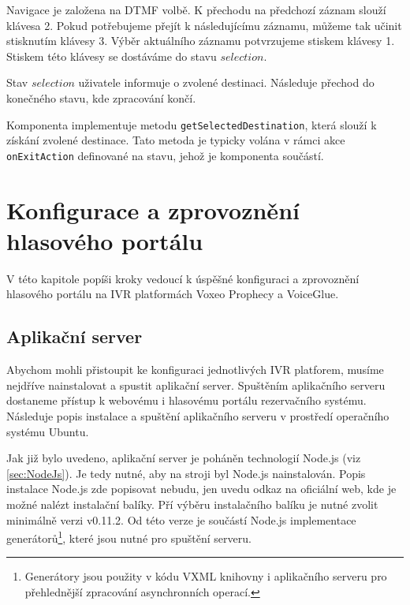 \documentclass[ing,male,java,dept460,twoside]{diploma}						%
\begin{document}
Navigace je založena na DTMF volbě. K přechodu na předchozí záznam slouží klávesa 2. Pokud potřebujeme přejít k následujícímu záznamu, můžeme tak učinit stisknutím klávesy 3. Výběr aktuálního záznamu potvrzujeme stiskem klávesy 1. Stiskem této klávesy se dostáváme do stavu $selection$.

Stav $selection$ uživatele informuje o zvolené destinaci. Následuje přechod do konečného stavu, kde zpracování končí.

Komponenta implementuje metodu \texttt{getSelectedDestination}, která slouží k získání zvolené destinace. Tato metoda je typicky volána v rámci akce \texttt{onExitAction} definované na stavu, jehož je komponenta součástí.



\section{Konfigurace a zprovoznění hlasového portálu}
V této kapitole popíši kroky vedoucí k úspěšné konfiguraci a zprovoznění hlasového portálu na IVR platformách Voxeo Prophecy a VoiceGlue.

\subsection{Aplikační server}
\label{sec:App_server}
Abychom mohli přistoupit ke konfiguraci jednotlivých IVR platforem, musíme nejdříve nainstalovat a spustit aplikační server. Spuštěním aplikačního serveru dostaneme přístup k webovému i hlasovému portálu rezervačního systému. Následuje popis instalace a spuštění aplikačního serveru v prostředí operačního systému Ubuntu.

Jak již bylo uvedeno, aplikační server je poháněn technologií Node.js (viz \ref{sec:NodeJs}). Je tedy nutné, aby na stroji byl Node.js nainstalován. Popis instalace Node.js zde popisovat nebudu, jen uvedu odkaz na oficiální web\cite{NodeJs_install}, kde je možné nalézt instalační balíky. Pří výběru instalačního balíku je nutné zvolit minimálně verzi v0.11.2. Od této verze je součástí Node.js implementace generátorů\footnote{Generátory jsou použity v kódu VXML knihovny i aplikačního serveru pro přehlednější zpracování asynchronních operací.}, které jsou nutné pro spuštění serveru.
\end{document}
